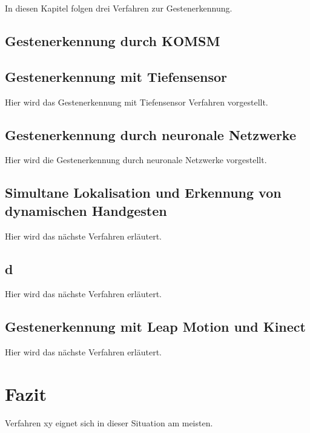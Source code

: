 In diesen Kapitel folgen drei Verfahren zur Gestenerkennung.

\subsection{Gestenerkennung durch KOMSM}
\subsection{Gestenerkennung mit Tiefensensor}
Hier wird das Gestenerkennung mit Tiefensensor Verfahren vorgestellt.
\subsection{Gestenerkennung durch neuronale Netzwerke}
Hier wird die Gestenerkennung durch neuronale Netzwerke vorgestellt.
\subsection{Simultane Lokalisation und Erkennung von dynamischen Handgesten}
Hier wird das nächste Verfahren erl\"autert.
\subsection{d}
Hier wird das nächste Verfahren erl\"autert.
\subsection{Gestenerkennung mit Leap Motion und Kinect}
Hier wird das nächste Verfahren erl\"autert.
\section{Fazit}
Verfahren xy eignet sich in dieser Situation am meisten.
